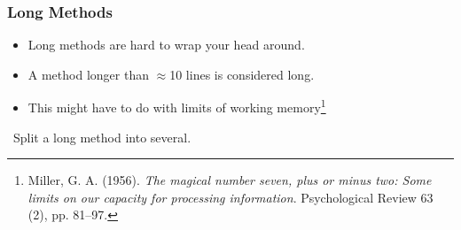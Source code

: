 \begin{frame}

\frametitle{Long Methods}

\begin{itemize}

\item Long methods are hard to wrap your head around.

\item A method longer than $\approx$10 lines is considered long.

\item This might have to do with limits of working memory\footnote{Miller, G.
A. (1956). \emph{The magical number seven, plus or minus two: Some limits on
our capacity for processing information}. Psychological Review 63 (2), pp.
81–97.}

\end{itemize}

\vspace{\fill}

\begin{center}

\leftthumbsup~Split a long method into several.~\rightthumbsup

\end{center}

\vspace{\fill}

\end{frame}
